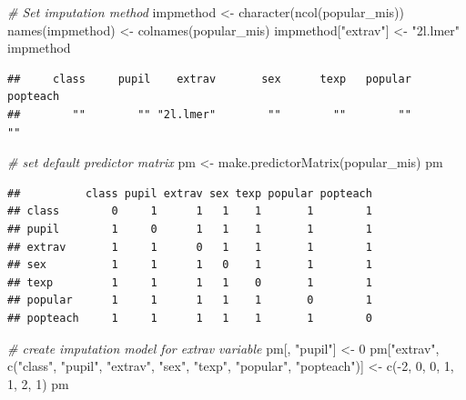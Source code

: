 \documentclass[
]{book}
\newenvironment{Shaded}{\begin{snugshade}}{\end{snugshade}}
\newcommand{\CommentTok}[1]{\textcolor[rgb]{0.56,0.35,0.01}{\textit{#1}}}
\newcommand{\DecValTok}[1]{\textcolor[rgb]{0.00,0.00,0.81}{#1}}
\newcommand{\FunctionTok}[1]{\textcolor[rgb]{0.00,0.00,0.00}{#1}}
\newcommand{\NormalTok}[1]{#1}
\newcommand{\OtherTok}[1]{\textcolor[rgb]{0.56,0.35,0.01}{#1}}
\newcommand{\SpecialCharTok}[1]{\textcolor[rgb]{0.00,0.00,0.00}{#1}}
\newcommand{\StringTok}[1]{\textcolor[rgb]{0.31,0.60,0.02}{#1}}
\begin{document}
\begin{Shaded}
\begin{Highlighting}[]
\CommentTok{\# Set imputation method}
\NormalTok{impmethod }\OtherTok{\textless{}{-}} \FunctionTok{character}\NormalTok{(}\FunctionTok{ncol}\NormalTok{(popular\_mis))}
\FunctionTok{names}\NormalTok{(impmethod) }\OtherTok{\textless{}{-}} \FunctionTok{colnames}\NormalTok{(popular\_mis)}
\NormalTok{impmethod[}\StringTok{"extrav"}\NormalTok{] }\OtherTok{\textless{}{-}} \StringTok{"2l.lmer"}
\NormalTok{impmethod}
\end{Highlighting}
\end{Shaded}

\begin{verbatim}
##     class     pupil    extrav       sex      texp   popular  popteach 
##        ""        "" "2l.lmer"        ""        ""        ""        ""
\end{verbatim}

\begin{Shaded}
\begin{Highlighting}[]
\CommentTok{\# set default predictor matrix}
\NormalTok{pm }\OtherTok{\textless{}{-}} \FunctionTok{make.predictorMatrix}\NormalTok{(popular\_mis)}
\NormalTok{pm}
\end{Highlighting}
\end{Shaded}

\begin{verbatim}
##          class pupil extrav sex texp popular popteach
## class        0     1      1   1    1       1        1
## pupil        1     0      1   1    1       1        1
## extrav       1     1      0   1    1       1        1
## sex          1     1      1   0    1       1        1
## texp         1     1      1   1    0       1        1
## popular      1     1      1   1    1       0        1
## popteach     1     1      1   1    1       1        0
\end{verbatim}

\begin{Shaded}
\begin{Highlighting}[]
\CommentTok{\# create imputation model for extrav variable}
\NormalTok{pm[, }\StringTok{"pupil"}\NormalTok{] }\OtherTok{\textless{}{-}} \DecValTok{0}
\NormalTok{pm[}\StringTok{"extrav"}\NormalTok{, }\FunctionTok{c}\NormalTok{(}\StringTok{"class"}\NormalTok{, }\StringTok{"pupil"}\NormalTok{, }\StringTok{"extrav"}\NormalTok{, }\StringTok{"sex"}\NormalTok{, }\StringTok{"texp"}\NormalTok{, }\StringTok{"popular"}\NormalTok{, }\StringTok{"popteach"}\NormalTok{)] }\OtherTok{\textless{}{-}} \FunctionTok{c}\NormalTok{(}\SpecialCharTok{{-}}\DecValTok{2}\NormalTok{, }\DecValTok{0}\NormalTok{, }\DecValTok{0}\NormalTok{, }\DecValTok{1}\NormalTok{, }\DecValTok{1}\NormalTok{, }\DecValTok{2}\NormalTok{, }\DecValTok{1}\NormalTok{)}
\NormalTok{pm}
\end{Highlighting}
\end{Shaded}
\end{document}
